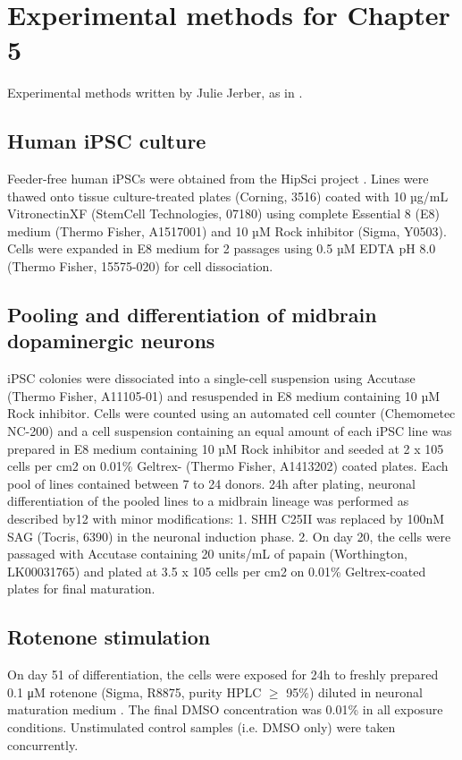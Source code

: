 \section{Experimental methods for Chapter 5}
Experimental methods written by Julie Jerber, as in \cite{jerber2020population}.

\subsection{Human iPSC culture}
Feeder-free human iPSCs were obtained from the HipSci project \cite{kilpinen2017common}. 
Lines were thawed onto tissue culture-treated plates (Corning, 3516) coated with 10 µg/mL VitronectinXF (StemCell Technologies, 07180) using complete Essential 8 (E8) medium (Thermo Fisher, A1517001) and 10 µM Rock inhibitor (Sigma, Y0503). 
Cells were expanded in E8 medium for 2 passages using 0.5 µM EDTA pH 8.0 (Thermo Fisher, 15575-020) for cell dissociation. 

\subsection{Pooling and differentiation of midbrain dopaminergic neurons}
iPSC colonies were dissociated into a single-cell suspension using Accutase (Thermo Fisher, A11105-01) and resuspended in E8 medium containing 10 µM Rock inhibitor. 
Cells were counted using an automated cell counter (Chemometec NC-200) and a cell suspension containing an equal amount of each iPSC line was prepared in E8 medium containing 10 µM Rock inhibitor and seeded at 2 x 105 cells per cm2 on 0.01\% Geltrex- (Thermo Fisher, A1413202) coated plates. 
Each pool of lines contained between 7 to 24 donors. 
24h after plating, neuronal differentiation of the pooled lines to a midbrain lineage was performed as described by12 with minor modifications: 1. SHH C25II was replaced by 100nM SAG (Tocris, 6390) in the neuronal induction phase. 
2. On day 20, the cells were passaged with Accutase containing 20 units/mL of papain (Worthington, LK00031765) and plated at 3.5 x 105 cells per cm2 on 0.01\% Geltrex-coated plates for final maturation.

\subsection{Rotenone stimulation}
On day 51 of differentiation, the cells were exposed for 24h to freshly prepared 0.1 μM rotenone (Sigma, R8875, purity HPLC $\geq$ 95\%) diluted in neuronal maturation medium \cite{kriks2011dopamine}. 
The final DMSO concentration was 0.01\% in all exposure conditions. 
Unstimulated control samples (i.e. DMSO only) were taken concurrently.

